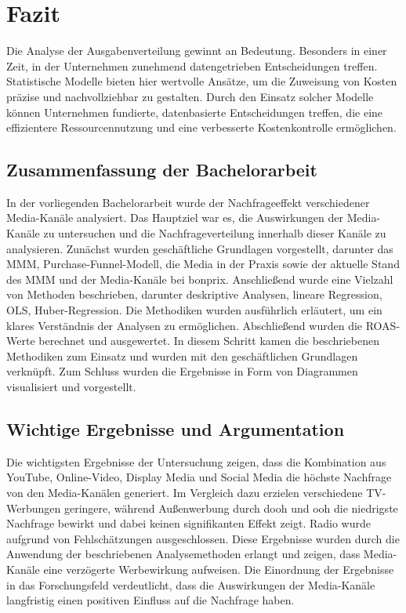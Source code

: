 \section{Fazit}
\label{Fazit}
Die Analyse der Ausgabenverteilung gewinnt an Bedeutung. Besonders in einer Zeit, in der Unternehmen zunehmend datengetrieben Entscheidungen treffen. Statistische Modelle bieten hier wertvolle Ansätze, um die Zuweisung von Kosten präzise und nachvollziehbar zu gestalten. Durch den Einsatz solcher Modelle können Unternehmen fundierte, datenbasierte Entscheidungen treffen, die eine effizientere Ressourcennutzung und eine verbesserte Kostenkontrolle ermöglichen.
\subsection{Zusammenfassung der Bachelorarbeit}
\label{Zusammenfassung}
In der vorliegenden Bachelorarbeit wurde der Nachfrageeffekt verschiedener Media-Kanäle analysiert. Das Hauptziel war es, die Auswirkungen der Media-Kanäle zu untersuchen und die Nachfrageverteilung innerhalb dieser Kanäle zu analysieren. Zunächst wurden geschäftliche Grundlagen vorgestellt, darunter das \ac{MMM}, Purchase-Funnel-Modell, die Media in der Praxis sowie der aktuelle Stand des \ac{MMM} und der Media-Kanäle bei bonprix. Anschließend wurde eine Vielzahl von Methoden beschrieben, darunter deskriptive Analysen, lineare Regression, \ac{OLS}, Huber-Regression. Die Methodiken wurden ausführlich erläutert, um ein klares Verständnis der Analysen zu ermöglichen. Abschließend wurden die \ac{ROAS}-Werte berechnet und ausgewertet. In diesem Schritt kamen die beschriebenen Methodiken zum Einsatz und wurden mit den geschäftlichen Grundlagen verknüpft. Zum Schluss wurden die Ergebnisse in Form von Diagrammen visualisiert und vorgestellt. 
\subsection{Wichtige Ergebnisse und Argumentation}
\label{Wichtige_Ergebnisse}
Die wichtigsten Ergebnisse der Untersuchung zeigen, dass die Kombination aus YouTube, Online-Video, Display Media und Social Media die höchste Nachfrage von den Media-Kanälen generiert. Im Vergleich dazu erzielen verschiedene TV-Werbungen geringere, während Außenwerbung durch \ac{dooh} und \ac{ooh} die niedrigste Nachfrage bewirkt und dabei keinen signifikanten Effekt zeigt. Radio wurde aufgrund von Fehlschätzungen ausgeschlossen. Diese Ergebnisse wurden durch die Anwendung der beschriebenen Analysemethoden erlangt und zeigen, dass Media-Kanäle eine verzögerte Werbewirkung aufweisen. Die Einordnung der Ergebnisse in das Forschungsfeld verdeutlicht, dass die Auswirkungen der Media-Kanäle langfristig einen positiven Einfluss auf die Nachfrage haben.
